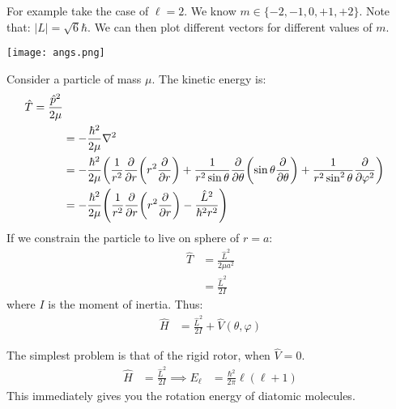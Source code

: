 For example take the case of $\ell = 2$. We know $m \in \{-2, -1, 0, +1, +2\}$. Note that: $|L| = \sqrt{6} \hbar$.
We can then plot different vectors for different values of $m$.

\texttt{[image: angs.png]}

Consider a particle of mass $\mu$. The kinetic energy is:
\begin{align*}
    \hat{T} = \frac{\hat{p}^2}{2 \mu} \\
    &= -\frac{\hbar^2}{2\mu} \nabla^2 \\
    &= -\frac{\hbar^2}{2\mu} \qty(\frac{1}{r^2} \pdv{}{r} \qty(r^2 \pdv{}{r}) + \frac{1}{r^2 \sin \theta} \pdv{}{\theta} \qty(\sin \theta \pdv{}{\theta}) + \frac{1}{r^2 \sin^2 \theta} \pdv{}{\varphi^2}) \\
    &= -\frac{\hbar^2}{2\mu} \qty(\frac{1}{r^2} \pdv{}{r} \qty(r^2 \pdv{}{r}) - \frac{\hat{L}^2}{\hbar^2 r^2}) \
\end{align*}
If we constrain the particle to live on sphere of $r = a$:
\begin{align*}
    \hat{T} &=\frac{\hat{L}^2}{2 \mu a^2} \\
    &= \frac{\hat{L}^2}{2I}
\end{align*}
where $I$ is the moment of inertia. Thus:
\begin{align*}
    \hat{H} &= \frac{\hat{L}^2}{2I} + \hat{V}(\theta, \varphi)
\end{align*}

The simplest problem is that of the rigid rotor, when $\hat{V} = 0$.
\begin{align*}
    \hat{H} &= \frac{\hat{L}^2}{2I} \implies E_{\ell} &= \frac{\hbar^2}{2\pi} \ell (\ell + 1)
\end{align*}
This immediately gives you the rotation energy of diatomic molecules.
